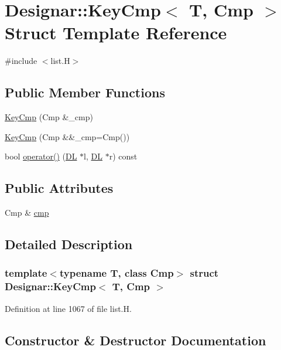 \hypertarget{struct_designar_1_1_key_cmp}{}\section{Designar\+:\+:Key\+Cmp$<$ T, Cmp $>$ Struct Template Reference}
\label{struct_designar_1_1_key_cmp}


{\ttfamily \#include $<$list.\+H$>$}

\subsection*{Public Member Functions}
\begin{DoxyCompactItemize}
\item 
\hyperlink{struct_designar_1_1_key_cmp_a8addea491666ad6d859113f8a03597c7}{Key\+Cmp} (Cmp \&\+\_\+cmp)
\item 
\hyperlink{struct_designar_1_1_key_cmp_a9e5e19bf38ff54d6c3dad828ceb63cd2}{Key\+Cmp} (Cmp \&\&\+\_\+cmp=Cmp())
\item 
bool \hyperlink{struct_designar_1_1_key_cmp_aa48c4fb700b4ba3bd243c3426288455e}{operator()} (\hyperlink{class_designar_1_1_d_l}{DL} $\ast$l, \hyperlink{class_designar_1_1_d_l}{DL} $\ast$r) const
\end{DoxyCompactItemize}
\subsection*{Public Attributes}
\begin{DoxyCompactItemize}
\item 
Cmp \& \hyperlink{struct_designar_1_1_key_cmp_a459613d03deb91c821f26cfafdd93dab}{cmp}
\end{DoxyCompactItemize}


\subsection{Detailed Description}
\subsubsection*{template$<$typename T, class Cmp$>$\newline
struct Designar\+::\+Key\+Cmp$<$ T, Cmp $>$}



Definition at line 1067 of file list.\+H.



\subsection{Constructor \& Destructor Documentation}
\mbox{\label{struct_designar_1_1_key_cmp_a8addea491666ad6d859113f8a03597c7}} 
